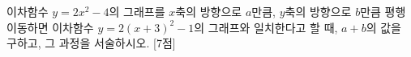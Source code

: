이차함수 $y=2x^2-4$의 그래프를 $x$축의 방향으로 $a$만큼, $y$축의 방향으로 $b$만큼 평행이동하면 이차함수 $y=2(x+3)^2-1$의 그래프와 일치한다고 할 때, $a+b$의 값을 구하고, 그 과정을 서술하시오. \mbox{[7점]}
